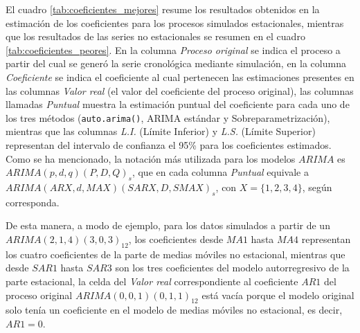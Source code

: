 \documentclass[
]{article}
\begin{document}
El cuadro \ref{tab:coeficientes_mejores} resume los resultados obtenidos
en la estimación de los coeficientes para los procesos simulados
estacionales, mientras que los resultados de las series no estacionales
se resumen en el cuadro \ref{tab:coeficientes_peores}. En la columna
\emph{Proceso original} se indica el proceso a partir del cual se generó
la serie cronológica mediante simulación, en la columna
\emph{Coeficiente} se indica el coeficiente al cual pertenecen las
estimaciones presentes en las columnas \emph{Valor real} (el valor del
coeficiente del proceso original), las columnas llamadas \emph{Puntual}
muestra la estimación puntual del coeficiente para cada uno de los tres
métodos (\texttt{auto.arima()}, ARIMA estándar y Sobreparametrización),
mientras que las columnas \emph{L.I.} (Límite Inferior) y \emph{L.S.}
(Límite Superior) representan del intervalo de confianza el 95\% para
los coeficientes estimados. Como se ha mencionado, la notación más
utilizada para los modelos \(ARIMA\) es \(ARIMA(p,d,q)(P,D,Q)_s\), que
en cada columna \emph{Puntual} equivale a
\(ARIMA(ARX, d, MAX)(SARX, D, SMAX)_s\), con \(X=\{1,2,3,4\}\), según
corresponda.

De esta manera, a modo de ejemplo, para los datos simulados a partir de
un \(ARIMA(2,1,4)(3,0,3)_{12}\), los coeficientes desde \(MA1\) hasta
\(MA4\) representan los cuatro coeficientes de la parte de medias
móviles no estacional, mientras que desde \(SAR1\) hasta \(SAR3\) son
los tres coeficientes del modelo autorregresivo de la parte estacional,
la celda del \emph{Valor real} correspondiente al coeficiente \(AR1\)
del proceso original \(ARIMA(0,0,1)(0,1,1)_{12}\) está vacía porque el
modelo original solo tenía un coeficiente en el modelo de medias móviles
no estacional, es decir, \(AR1=0\).
\end{document}
